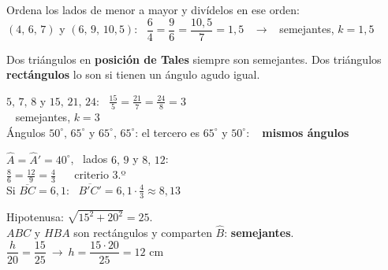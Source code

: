 \documentclass[11pt,a4paper]{article}
\newcommand{\heavy}{\fontseries{eb}\selectfont}
\newcommand{\be}[1]{{\color{fmok}\faCheckCircle}\ \ensuremath{#1}}
\begin{document}
\vfill
\begin{truc}
Ordena los lados de menor a mayor y divídelos en ese orden:\\[3pt]
$(4,\,6,\,7)$ y $(6,\,9,\,10{,}5)$: \ $\dfrac64=\dfrac96=\dfrac{10{,}5}{7}=1{,}5$ \ $\to$ \ semejantes, $k=1{,}5$
\end{truc}

\vfill
{\large Dos triángulos en \textbf{posición de Tales} siempre son semejantes. Dos triángulos \textbf{rectángulos} lo son si tienen un ángulo agudo igual.}

\vfill
\begin{exemple}[Ejemplos]
\begin{minipage}[t]{0.48\linewidth}
$5,\,7,\,8$ y $15,\,21,\,24$: \ $\frac{15}{5}=\frac{21}{7}=\frac{24}{8}=3$\\ \be{} semejantes, $\boxed{k=3}$\\[5pt]
Ángulos $50^\circ,\,65^\circ$ y $65^\circ,\,65^\circ$: el tercero es $65^\circ$ y $50^\circ$: \be{} \textbf{mismos ángulos}
\end{minipage}\hfill
\begin{minipage}[t]{0.49\linewidth}
$\hat A=\hat A'=40^\circ$, \ lados $6,\,9$ y $8,\,12$:\\
$\frac86=\frac{12}{9}=\frac43$ \ \be{} criterio 3.º\\[3pt]
Si $\overline{BC}=6{,}1$: \ $\overline{B'C'}=6{,}1\cdot\frac43\approx\boxed{8{,}13}$
\end{minipage}
\end{exemple}

\vfill
\begin{exemple}
\begin{minipage}[c]{0.6\linewidth}
Hipotenusa: $\sqrt{15^2+20^2}=25$.\\[3pt]
$ABC$ y $HBA$ son rectángulos y comparten $\hat B$: \textbf{semejantes}.\\[3pt]
$\dfrac{h}{20}=\dfrac{15}{25}\ \to\ h=\dfrac{15\cdot20}{25}=\boxed{12\text{ cm}}$
\end{minipage}\hfill
\begin{minipage}[c]{0.36\linewidth}\centering
{}
\end{minipage}
\end{exemple}
\end{document}
